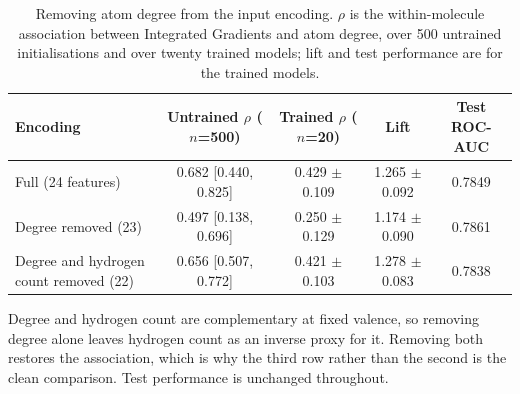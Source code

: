 \begin{table}[htbp]
\centering
\caption{Removing atom degree from the input encoding. $\rho$ is the within-molecule association between Integrated Gradients and atom degree, over 500 untrained initialisations and over twenty trained models; lift and test performance are for the trained models.}
\label{tab:encoding}
\small
\setlength{\tabcolsep}{4pt}
\begin{tabular}{lcccc}
\toprule
Encoding & Untrained $\rho$ ($n$=500) & Trained $\rho$ ($n$=20) & Lift & Test ROC-AUC \\
\midrule
Full (24 features) & 0.682 [0.440, 0.825] & 0.429 $\pm$ 0.109 & 1.265 $\pm$ 0.092 & 0.7849 \\
Degree removed (23) & 0.497 [0.138, 0.696] & 0.250 $\pm$ 0.129 & 1.174 $\pm$ 0.090 & 0.7861 \\
Degree and hydrogen count removed (22) & 0.656 [0.507, 0.772] & 0.421 $\pm$ 0.103 & 1.278 $\pm$ 0.083 & 0.7838 \\
\bottomrule
\end{tabular}
\begin{flushleft}\footnotesize Degree and hydrogen count are complementary at fixed valence, so removing degree alone leaves hydrogen count as an inverse proxy for it. Removing both restores the association, which is why the third row rather than the second is the clean comparison. Test performance is unchanged throughout.\end{flushleft}
\end{table}
